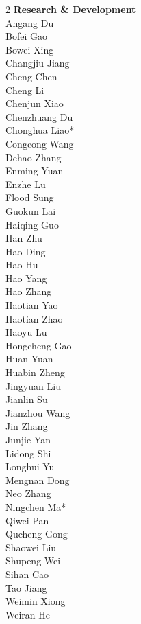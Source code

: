 \documentclass{article}
\begin{document}
\begin{multicols}{2}
\noindent
\textbf{Research \& Development} \\

Angang Du \\
Bofei Gao \\
Bowei Xing \\
Changjiu Jiang \\
Cheng Chen \\
Cheng Li \\
Chenjun Xiao \\
Chenzhuang Du \\
Chonghua Liao* \\
Congcong Wang \\
Dehao Zhang \\
Enming Yuan \\
Enzhe Lu \\
Flood Sung \\
Guokun Lai \\
Haiqing Guo \\
Han Zhu \\
Hao Ding \\
Hao Hu \\
Hao Yang \\
Hao Zhang \\
Haotian Yao \\
Haotian Zhao \\
Haoyu Lu \\
Hongcheng Gao \\
Huan Yuan \\
Huabin Zheng \\
Jingyuan Liu \\
Jianlin Su \\
Jianzhou Wang \\
Jin Zhang \\
Junjie Yan \\
Lidong Shi \\
Longhui Yu \\
Mengnan Dong \\
Neo Zhang \\
Ningchen Ma* \\
Qiwei Pan \\
Qucheng Gong \\
Shaowei Liu \\
Shupeng Wei \\
Sihan Cao \\
Tao Jiang \\
Weimin Xiong \\
Weiran He \\

\end{multicols}
\end{document}
